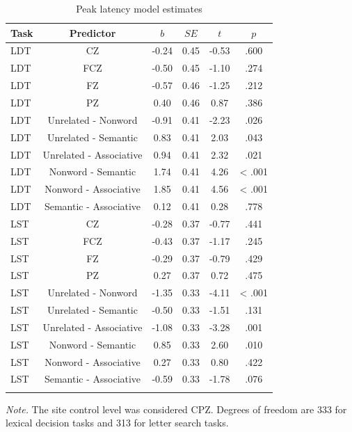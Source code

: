 \documentclass[english,man]{apa6}
\theoremstyle{definition}
\theoremstyle{definition}
\theoremstyle{definition}
\theoremstyle{remark}
\begin{document}
\begin{table}[tbp]
\begin{center}
\begin{threeparttable}
\caption{\label{tab:Peak-table-est}Peak latency model estimates}
\begin{tabular}{lccccc}
\toprule
Task & Predictor & $b$ & $SE$ & $t$ & $p$\\
\midrule
LDT & CZ & -0.24 & 0.45 & -0.53 & .600\\
LDT & FCZ & -0.50 & 0.45 & -1.10 & .274\\
LDT & FZ & -0.57 & 0.46 & -1.25 & .212\\
LDT & PZ & 0.40 & 0.46 & 0.87 & .386\\
LDT & Unrelated - Nonword & -0.91 & 0.41 & -2.23 & .026\\
LDT & Unrelated - Semantic & 0.83 & 0.41 & 2.03 & .043\\
LDT & Unrelated - Associative & 0.94 & 0.41 & 2.32 & .021\\
LDT & Nonword - Semantic & 1.74 & 0.41 & 4.26 & < .001\\
LDT & Nonword - Associative & 1.85 & 0.41 & 4.56 & < .001\\
LDT & Semantic - Associative & 0.12 & 0.41 & 0.28 & .778\\
LST & CZ & -0.28 & 0.37 & -0.77 & .441\\
LST & FCZ & -0.43 & 0.37 & -1.17 & .245\\
LST & FZ & -0.29 & 0.37 & -0.79 & .429\\
LST & PZ & 0.27 & 0.37 & 0.72 & .475\\
LST & Unrelated - Nonword & -1.35 & 0.33 & -4.11 & < .001\\
LST & Unrelated - Semantic & -0.50 & 0.33 & -1.51 & .131\\
LST & Unrelated - Associative & -1.08 & 0.33 & -3.28 & .001\\
LST & Nonword - Semantic & 0.85 & 0.33 & 2.60 & .010\\
LST & Nonword - Associative & 0.27 & 0.33 & 0.80 & .422\\
LST & Semantic - Associative & -0.59 & 0.33 & -1.78 & .076\\
\bottomrule
\addlinespace
\end{tabular}
\begin{tablenotes}[para]
\textit{Note.} The site control level was considered CPZ. Degrees of freedom are 333 for lexical decision tasks and 313 for letter search tasks.
\end{tablenotes}
\end{threeparttable}
\end{center}
\end{table}
\end{document}
